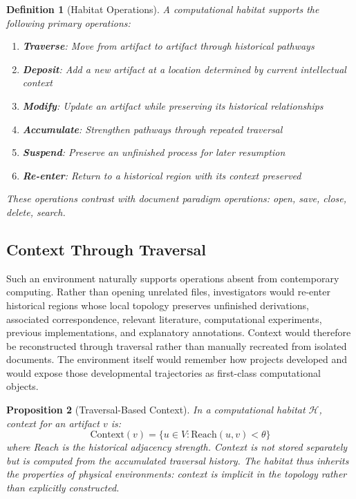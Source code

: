 \documentclass[12pt,oneside]{article}
\newtheorem{definition}{Definition}[section]
\newtheorem{proposition}[definition]{Proposition}
\theoremstyle{remark}
\begin{document}
\begin{definition}[Habitat Operations]
A computational habitat supports the following primary operations:
\begin{enumerate}
\item \textbf{Traverse}: Move from artifact to artifact through historical pathways
\item \textbf{Deposit}: Add a new artifact at a location determined by current intellectual context
\item \textbf{Modify}: Update an artifact while preserving its historical relationships
\item \textbf{Accumulate}: Strengthen pathways through repeated traversal
\item \textbf{Suspend}: Preserve an unfinished process for later resumption
\item \textbf{Re-enter}: Return to a historical region with its context preserved
\end{enumerate}
These operations contrast with document paradigm operations: open, save, close, delete, search.
\end{definition}

\subsection{Context Through Traversal}

Such an environment naturally supports operations absent from contemporary computing. Rather than opening unrelated files, investigators would re-enter historical regions whose local topology preserves unfinished derivations, associated correspondence, relevant literature, computational experiments, previous implementations, and explanatory annotations. Context would therefore be reconstructed through traversal rather than manually recreated from isolated documents. The environment itself would remember how projects developed and would expose those developmental trajectories as first-class computational objects.

\begin{proposition}[Traversal-Based Context]
In a computational habitat \(\mathcal{H}\), context for an artifact \(v\) is:
\[
\text{Context}(v) = \{u \in V : \text{Reach}(u, v) < \theta\}
\]
where Reach is the historical adjacency strength. Context is not stored separately but is computed from the accumulated traversal history. The habitat thus inherits the properties of physical environments: context is implicit in the topology rather than explicitly constructed.
\end{proposition}
\end{document}
